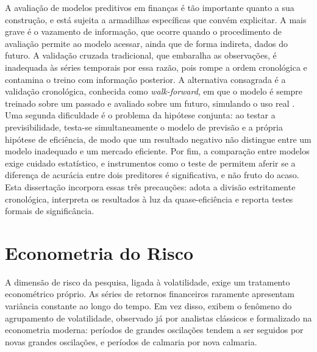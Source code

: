 A avaliação de modelos preditivos em finanças é tão importante quanto a sua construção, e está sujeita a armadilhas específicas que convém explicitar. A mais grave é o vazamento de informação, que ocorre quando o procedimento de avaliação permite ao modelo acessar, ainda que de forma indireta, dados do futuro. A validação cruzada tradicional, que embaralha as observações, é inadequada às séries temporais por essa razão, pois rompe a ordem cronológica e contamina o treino com informação posterior. A alternativa consagrada é a validação cronológica, conhecida como \textit{walk-forward}, em que o modelo é sempre treinado sobre um passado e avaliado sobre um futuro, simulando o uso real \cite{henrique_literature_2019}. Uma segunda dificuldade é o problema da hipótese conjunta: ao testar a previsibilidade, testa-se simultaneamente o modelo de previsão e a própria hipótese de eficiência, de modo que um resultado negativo não distingue entre um modelo inadequado e um mercado eficiente. Por fim, a comparação entre modelos exige cuidado estatístico, e instrumentos como o teste de  permitem aferir se a diferença de acurácia entre dois preditores é significativa, e não fruto do acaso. Esta dissertação incorpora essas três precauções: adota a divisão estritamente cronológica, interpreta os resultados à luz da quase-eficiência e reporta testes formais de significância.

\section{Econometria do Risco}

A dimensão de risco da pesquisa, ligada à volatilidade, exige um tratamento econométrico próprio. As séries de retornos financeiros raramente apresentam variância constante ao longo do tempo. Em vez disso, exibem o fenômeno do agrupamento de volatilidade, observado já por analistas clássicos e formalizado na econometria moderna: períodos de grandes oscilações tendem a ser seguidos por novas grandes oscilações, e períodos de calmaria por nova calmaria.

